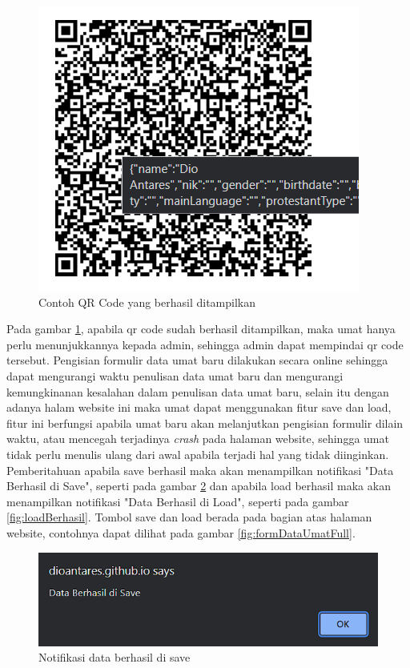\begin{figure}[H]
	\centering
	\includegraphics[scale=0.7]{Gambar/contohQRCodeSubmit.png}
	\caption{Contoh QR Code yang berhasil ditampilkan} 
	\label{fig:contohQRCodeSubmit}
\end{figure}

Pada gambar \ref{fig:contohQRCodeSubmit}, apabila qr code sudah berhasil ditampilkan, maka umat hanya perlu menunjukkannya kepada admin, sehingga admin dapat mempindai qr code tersebut. Pengisian formulir data umat baru dilakukan secara online sehingga dapat mengurangi waktu penulisan data umat baru dan mengurangi kemungkinanan kesalahan dalam penulisan data umat baru, selain itu dengan adanya halam website ini maka umat dapat menggunakan fitur save dan load, fitur ini berfungsi apabila umat baru akan melanjutkan pengisian formulir dilain waktu, atau mencegah terjadinya \textit{crash} pada halaman website, sehingga umat tidak perlu menulis ulang dari awal apabila terjadi hal yang tidak diinginkan. Pemberitahuan apabila save berhasil maka akan menampilkan notifikasi "Data Berhasil di Save", seperti pada gambar \ref{fig:saveBerhasil} dan apabila load berhasil maka akan menampilkan notifikasi "Data Berhasil di Load", seperti pada gambar \ref{fig:loadBerhasil}. Tombol save dan load berada pada bagian atas halaman website, contohnya dapat dilihat pada gambar \ref{fig:formDataUmatFull}.

\begin{figure}[H]
	\centering
	\includegraphics[scale=0.7]{Gambar/saveBerhasil.png}
	\caption{Notifikasi data berhasil di save} 
	\label{fig:saveBerhasil}
\end{figure}

